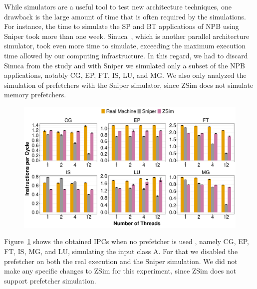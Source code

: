\documentclass[AMA,final,STIX1COL]{WileyNJD-v2}
\newcommand\new[1]{{\color{red}{#1}}}
\begin{document}
While simulators are a useful tool to test new architecture techniques, one drawback is the large amount of time that is often required by the simulations. For instance, the time to simulate the SP and BT applications of NPB using Sniper took more than one week. Sinuca~\cite{alves2015sinuca}, which is another parallel architecture simulator, took even more time to simulate, exceeding the maximum execution time allowed by our computing infrastructure. In this regard, we had to discard Sinuca from the study and with Sniper we simulated only a subset of the NPB applications, notably CG, EP, FT, IS, LU, and MG. 
We also only analyzed the simulation of prefetchers with the Sniper simulator, since ZSim does not simulate memory prefetchers. 

\begin{figure}[!htb]
    \centering
    \includegraphics[width=\linewidth]{figures/ipc-no-prefetch-all.pdf}
    \caption{\new{Obtained IPCs when no prefetcher is used for ZSim and Sniper simulations and the real execution.}}
    \label{fig:sims_nopref}
\end{figure}

Figure~\ref{fig:sims_nopref} shows the obtained IPCs when no prefetcher is used \new{for the simulations and the real execution of six NPB applications}, namely CG, EP, FT, IS, MG, and LU, simulating the input class A.
For that we disabled the prefetcher on both the real execution and the Sniper simulation. 
We did not make any specific changes to ZSim for this experiment, since ZSim does not support prefetcher simulation.
\end{document}
